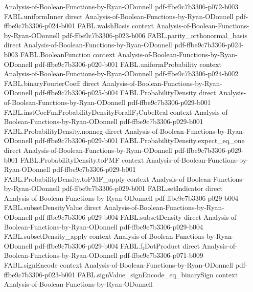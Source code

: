 \begin{theorem}
  {Analysis-of-Boolean-Functions-by-Ryan-ODonnell}
  {pdf-ffbe9c7b3306-p072-b003}
\proofstep
  {FABL.uniformInner}
  {direct}
  {Analysis-of-Boolean-Functions-by-Ryan-ODonnell}
  {pdf-ffbe9c7b3306-p024-b001}
\proofstep
  {FABL.walshBasis}
  {context}
  {Analysis-of-Boolean-Functions-by-Ryan-ODonnell}
  {pdf-ffbe9c7b3306-p023-b006}
\proofstep
  {FABL.parity_orthonormal_basis}
  {direct}
  {Analysis-of-Boolean-Functions-by-Ryan-ODonnell}
  {pdf-ffbe9c7b3306-p024-b003}
\proofstep
  {FABL.BooleanFunction}
  {context}
  {Analysis-of-Boolean-Functions-by-Ryan-ODonnell}
  {pdf-ffbe9c7b3306-p020-b001}
\proofstep
  {FABL.uniformProbability}
  {context}
  {Analysis-of-Boolean-Functions-by-Ryan-ODonnell}
  {pdf-ffbe9c7b3306-p024-b002}
\proofstep
  {FABL.binaryFourierCoeff}
  {direct}
  {Analysis-of-Boolean-Functions-by-Ryan-ODonnell}
  {pdf-ffbe9c7b3306-p025-b004}
\proofstep
  {FABL.ProbabilityDensity}
  {direct}
  {Analysis-of-Boolean-Functions-by-Ryan-ODonnell}
  {pdf-ffbe9c7b3306-p029-b001}
\proofstep
  {FABL.instCoeFunProbabilityDensityForallF₂CubeReal}
  {context}
  {Analysis-of-Boolean-Functions-by-Ryan-ODonnell}
  {pdf-ffbe9c7b3306-p029-b001}
\proofstep
  {FABL.ProbabilityDensity.nonneg}
  {direct}
  {Analysis-of-Boolean-Functions-by-Ryan-ODonnell}
  {pdf-ffbe9c7b3306-p029-b001}
\proofstep
  {FABL.ProbabilityDensity.expect_eq_one}
  {direct}
  {Analysis-of-Boolean-Functions-by-Ryan-ODonnell}
  {pdf-ffbe9c7b3306-p029-b001}
\proofstep
  {FABL.ProbabilityDensity.toPMF}
  {context}
  {Analysis-of-Boolean-Functions-by-Ryan-ODonnell}
  {pdf-ffbe9c7b3306-p029-b001}
\proofstep
  {FABL.ProbabilityDensity.toPMF_apply}
  {context}
  {Analysis-of-Boolean-Functions-by-Ryan-ODonnell}
  {pdf-ffbe9c7b3306-p029-b001}
\proofstep
  {FABL.setIndicator}
  {direct}
  {Analysis-of-Boolean-Functions-by-Ryan-ODonnell}
  {pdf-ffbe9c7b3306-p029-b004}
\proofstep
  {FABL.subsetDensityValue}
  {direct}
  {Analysis-of-Boolean-Functions-by-Ryan-ODonnell}
  {pdf-ffbe9c7b3306-p029-b004}
\proofstep
  {FABL.subsetDensity}
  {direct}
  {Analysis-of-Boolean-Functions-by-Ryan-ODonnell}
  {pdf-ffbe9c7b3306-p029-b004}
\proofstep
  {FABL.subsetDensity_apply}
  {context}
  {Analysis-of-Boolean-Functions-by-Ryan-ODonnell}
  {pdf-ffbe9c7b3306-p029-b004}
\proofstep
  {FABL.f₂DotProduct}
  {direct}
  {Analysis-of-Boolean-Functions-by-Ryan-ODonnell}
  {pdf-ffbe9c7b3306-p071-b009}
\proofstep
  {FABL.signEncode}
  {context}
  {Analysis-of-Boolean-Functions-by-Ryan-ODonnell}
  {pdf-ffbe9c7b3306-p023-b001}
\proofstep
  {FABL.signValue_signEncode_eq_binarySign}
  {context}
  {Analysis-of-Boolean-Functions-by-Ryan-ODonnell}

\end{theorem}
